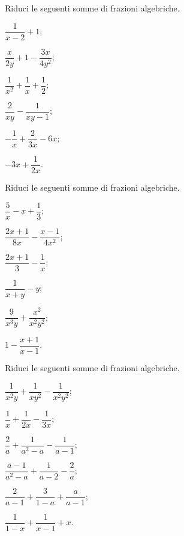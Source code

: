 \begin{esercizio}
\label{ese:14.24}
Riduci le seguenti somme di frazioni algebriche.
\begin{multicols}{3}
\begin{enumeratea}
 \item $\dfrac{1}{x-2}+1$;
 \item $\dfrac{x}{2y}+1-\dfrac{3x}{4y^{2}}$;
 \item $\dfrac{1}{x^{2}}+\dfrac{1}{x}+\dfrac{1}{2}$;
 \item $\dfrac{2}{xy}-\dfrac{1}{xy-1}$;
 \item $-{\dfrac{1}{x}}+\dfrac{2}{3x}-6x$;
 \item $-3x+\dfrac{1}{2x}$.
\end{enumeratea}
\end{multicols}
\end{esercizio}

\begin{esercizio}
\label{ese:14.25}
Riduci le seguenti somme di frazioni algebriche.
\begin{multicols}{3}
\begin{enumeratea}
 \item $\dfrac{5}{x}-x+\dfrac{1}{3}$;
 \item $\dfrac{2x+1}{8x}-\dfrac{x-1}{4x^{2}}$;
 \item $\dfrac{2x+1}{3}-\dfrac{1}{x}$;
 \item $\dfrac{1}{x+y}-y$;
 \item $\dfrac{9}{x^{3}y}+\dfrac{x^{2}}{x^{2}y^{2}}$;
 \item $1-\dfrac{x+1}{x-1}$.
\end{enumeratea}
\end{multicols}
\end{esercizio}

\begin{esercizio}[\Ast]
\label{ese:14.26}
Riduci le seguenti somme di frazioni algebriche.
\begin{multicols}{3}
\begin{enumeratea}
 \item $\dfrac{1}{x^{2}y}+\dfrac{1}{xy^{2}}-\dfrac{1}{x^{2}y^{2}}$;
 \item $\dfrac{1}{x}+\dfrac{1}{2x}-\dfrac{1}{3x}$;
 \item $\dfrac{2}{a}+\dfrac{1}{a^{{2}}-a}-\dfrac{1}{a-1}$;
 \item $\dfrac{a-1}{a^{2}-a}+\dfrac{1}{a-2}-\dfrac{2}{a}$;
 \item $\dfrac{2}{a-1}+\dfrac{3}{1-a}+\dfrac{a}{a-1}$;
 \item $\dfrac{1}{1-x}+\dfrac{1}{x-1}+x$.
\end{enumeratea}
\end{multicols}
\end{esercizio}

